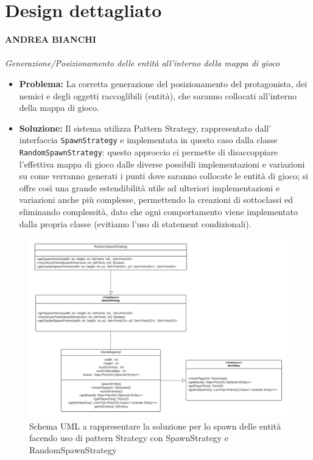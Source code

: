 \documentclass[a4paper,12pt]{report}
\begin{document}
\section{Design dettagliato}
\textbf{ANDREA BIANCHI}
\\ \\
\textit{Generazione/Posizionamento delle entità all’interno della mappa di gioco}
\begin{itemize}
    \item \textbf{Problema:} La corretta generazione del posizionamento del protagonista, dei nemici e degli oggetti raccoglibili (entità), che saranno collocati all’interno della mappa di gioco.
    \item \textbf{Soluzione:} Il sistema utilizza Pattern Strategy, rappresentato dall’ interfaccia \verb|SpawnStrategy| e implementata in questo caso dalla classe \verb|RandomSpawnStrategy|: questo approccio ci permette di disaccoppiare l’effettiva mappa di gioco dalle diverse possibili implementazioni e variazioni su come verranno generati i punti dove saranno collocate le entità di gioco; si offre così una grande estendibilità utile ad ulteriori implementazioni e variazioni anche più complesse, permettendo la creazioni di sottoclassi ed eliminando complessità, dato che ogni comportamento viene implementato dalla propria classe (evitiamo l’uso di statement condizionali).
\end{itemize}
\begin{figure}[H]
\centering{}
\includegraphics[width=\textwidth,height=\textheight,keepaspectratio]{img/spawnStrategy.pdf}
\caption{Schema UML a rappresentare la soluzione per lo spawn delle entità facendo uso di pattern Strategy con SpawnStrategy e RandomSpawnStrategy}
\label{img:spawnStrategyUML}
\end{figure}
\end{document}
